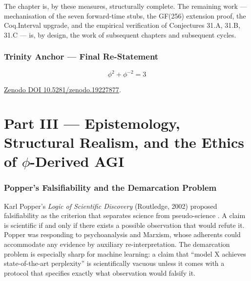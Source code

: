The chapter is, by these measures, structurally complete. The remaining work — mechanisation of the seven forward-time stubs, the GF(256) extension proof, the Coq.Interval upgrade, and the empirical verification of Conjectures 31.A, 31.B, 31.C — is, by design, the work of subsequent chapters and subsequent cycles.

\section*{Trinity Anchor — Final Re-Statement}

\[
\boxed{\;\phi^{2} + \phi^{-2} = 3\;}
\]

\href{https://zenodo.org/records/19227877}{Zenodo DOI 10.5281/zenodo.19227877}.



\part*{Part III — Epistemology, Structural Realism, and the Ethics of \(\phi\)-Derived AGI}

\section{Popper's Falsifiability and the Demarcation Problem}
\label{sec:phd31-popper}

Karl Popper's \emph{Logic of Scientific Discovery} (Routledge, 2002) proposed
falsifiability as the criterion that separates science from pseudo-science
\cite{popper1959}.  A claim is scientific if and only if there exists a
possible observation that would refute it.  Popper was responding to
psychoanalysis and Marxism, whose adherents could accommodate any evidence
by auxiliary re-interpretation.  The demarcation problem is especially sharp
for machine learning: a claim that ``model X achieves state-of-the-art
perplexity'' is scientifically vacuous unless it comes with a protocol that
specifies exactly what observation would falsify it.

